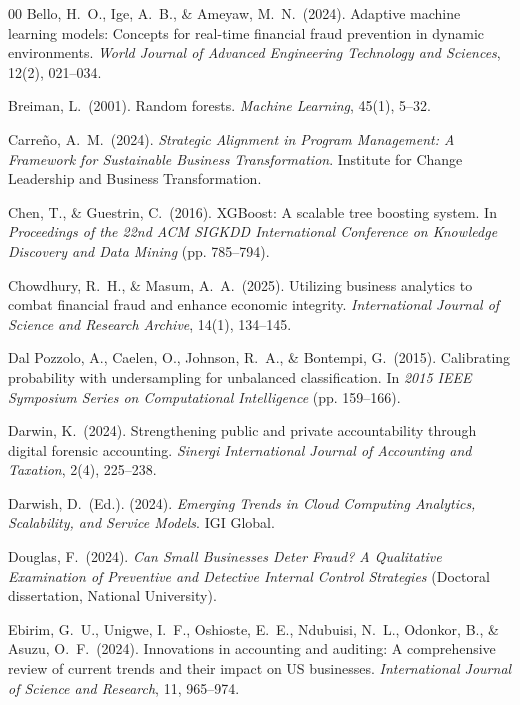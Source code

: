 \documentclass[preprint,12pt]{elsarticle}
\begin{document}
\begin{thebibliography}{00}
 Bello, H.\ O., Ige, A.\ B., \& Ameyaw, M.\ N.\ (2024). Adaptive machine learning models: Concepts for real-time financial fraud prevention in dynamic environments. \emph{World Journal of Advanced Engineering Technology and Sciences}, 12(2), 021--034.

 Breiman, L.\ (2001). Random forests. \emph{Machine Learning}, 45(1), 5--32.

 Carre\~no, A.\ M.\ (2024). \emph{Strategic Alignment in Program Management: A Framework for Sustainable Business Transformation}. Institute for Change Leadership and Business Transformation.

 Chen, T., \& Guestrin, C.\ (2016). XGBoost: A scalable tree boosting system. In \emph{Proceedings of the 22nd ACM SIGKDD International Conference on Knowledge Discovery and Data Mining} (pp. 785--794).

 Chowdhury, R.\ H., \& Masum, A.\ A.\ (2025). Utilizing business analytics to combat financial fraud and enhance economic integrity. \emph{International Journal of Science and Research Archive}, 14(1), 134--145.

 Dal Pozzolo, A., Caelen, O., Johnson, R.\ A., \& Bontempi, G.\ (2015). Calibrating probability with undersampling for unbalanced classification. In \emph{2015 IEEE Symposium Series on Computational Intelligence} (pp. 159--166).

 Darwin, K.\ (2024). Strengthening public and private accountability through digital forensic accounting. \emph{Sinergi International Journal of Accounting and Taxation}, 2(4), 225--238.

 Darwish, D.\ (Ed.). (2024). \emph{Emerging Trends in Cloud Computing Analytics, Scalability, and Service Models}. IGI Global.

 Douglas, F.\ (2024). \emph{Can Small Businesses Deter Fraud? A Qualitative Examination of Preventive and Detective Internal Control Strategies} (Doctoral dissertation, National University).

 Ebirim, G.\ U., Unigwe, I.\ F., Oshioste, E.\ E., Ndubuisi, N.\ L., Odonkor, B., \& Asuzu, O.\ F.\ (2024). Innovations in accounting and auditing: A comprehensive review of current trends and their impact on US businesses. \emph{International Journal of Science and Research}, 11, 965--974.


\end{thebibliography}
\end{document}

